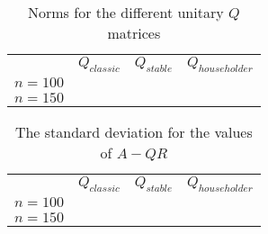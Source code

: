 \documentclass[a4paper,11pt]{article}
\begin{document}
\begin{table}[h]
  \begin{tabular}{r|c|c|c|}
    \multicolumn{1}{r}{}
     & \multicolumn{1}{c}{$Q_{classic}$ }
     & \multicolumn{1}{c}{$Q_{stable}$}
     & \multicolumn{1}{c}{$Q_{householder}$} \\
    \cline{2-4}
    $n=100$ & 
            & 
            & 
            \\ \cline{2-4}
    $n=150$ & 
            & 
            & 
            \\ \cline{2-4}
  \end{tabular}
  \caption{Norms for the different unitary $Q$ matrices}
  \label{tab:norms}
\end{table}

\begin{table}[h]
  \begin{tabular}{r|c|c|c|}
    \multicolumn{1}{r}{}
     & \multicolumn{1}{c}{$Q_{classic}$ }
     & \multicolumn{1}{c}{$Q_{stable}$}
     & \multicolumn{1}{c}{$Q_{householder}$} \\
    \cline{2-4}
    $n=100$ & 
            & 
            & 
            \\ \cline{2-4}
    $n=150$ & 
            & 
            & 
            \\ \cline{2-4}
  \end{tabular}
  \caption{The standard deviation for the values of $A-QR$}
  \label{tab:stds}
\end{table}

\newcommand{\genfig}[3] {{
    \begin{figure}
            \centering
            \begin{subfigure}[b]{1.0\textwidth}
                    \texttt{[image: fig/\#1-\#2-100]}
                    \caption{$n = 100$}
            \end{subfigure}
            \begin{subfigure}[b]{1.0\textwidth}
                    \texttt{[image: fig/\#1-\#2-150]}
                    \caption{$n = 150$}
            \end{subfigure}
            \caption{Medians of the columns of $\Delta #2$ #3}\label{fig:#1-#2}
    \end{figure}
  }}
\end{document}
